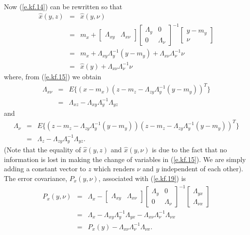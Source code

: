 	Now (\ref{e.kf.14}) can be rewritten so that
%
\begin{eqnarray}
\hat{x}(y,z)&=&\hat{x}(y,\nu)\nonumber\\
            &=&m_x+[\begin{array}{cc}
\Lambda_{xy}&\Lambda_{x\nu}\end{array}]
\left[\begin{array}{cc}\Lambda_y & 0\\
                       0 & \Lambda_{\nu}\end{array}\right]^{-1}
\left[\begin{array}{c}
y-m_y\\\nu\end{array}\right]\nonumber\\
           &=&m_x+\Lambda_{xy}\Lambda_y^{-1}(y-m_y)+\Lambda_{x\nu}
               \Lambda_{\nu}^{-1}\nu\nonumber\\
           &=&\hat{x}(y)+\Lambda_{x\nu}\Lambda_{\nu}^{-1}\nu
\label{e.kf.19}
\end{eqnarray}
%
where, from (\ref{e.kf.15}) we obtain
%
\begin{eqnarray}
\Lambda_{x\nu}&=&E\{(x-m_x)(z-m_z-\Lambda_{zy}\Lambda_y^{-1}(y-m_y))^T\}\nonumber\\
       &=&\Lambda_{xz}-\Lambda_{xy}\Lambda_y^{-1}\Lambda_{yz}
\label{e.kf.20}
\end{eqnarray}
%
and
%
\begin{eqnarray}
\Lambda_{\nu}&=&E\{(z-m_z-\Lambda_{zy}\Lambda_y^{-1}(y-m_y))(z-m_z-\Lambda_{zy}\Lambda_y^{-1}(y-m_y))^T\}\nonumber\\
       &=&\Lambda_{z}-\Lambda_{zy}\Lambda_y^{-1}\Lambda_{yz}.
\label{e.kf.21}
\end{eqnarray}
%
(Note that the equality of $\hat{x}(y,z)$ and $\hat{x}(y,\nu)$ is due to the
fact that no information is lost in making the change of
variables in (\ref{e.kf.15}).  We are simply adding a constant vector
to $z$ which renders $\nu$ and $y$ independent of each other).
The error covariance, $P_x(y,\nu)$, associated with (\ref{e.kf.19}) is
%
\begin{eqnarray}
P_x(y,\nu)&=&
            \Lambda_x-[\begin{array}{cc}
\Lambda_{xy}&\Lambda_{x\nu}\end{array}]
\left[\begin{array}{cc}\Lambda_y & 0\\
                       0 & \Lambda_{\nu}\end{array}\right]^{-1}
\left[\begin{array}{c}
\Lambda_{yx}\\\Lambda_{\nu x}\end{array}\right]\nonumber\\
           &=&\Lambda_x-\Lambda_{xy}\Lambda_y^{-1}\Lambda_{yx}-\Lambda_{x\nu}
               \Lambda_{\nu}^{-1}\Lambda_{\nu x}\nonumber\\
           &=&P_x(y)-\Lambda_{x\nu}\Lambda_{\nu}^{-1}\Lambda_{\nu x}.
\label{e.kf.22}
\end{eqnarray}
%
